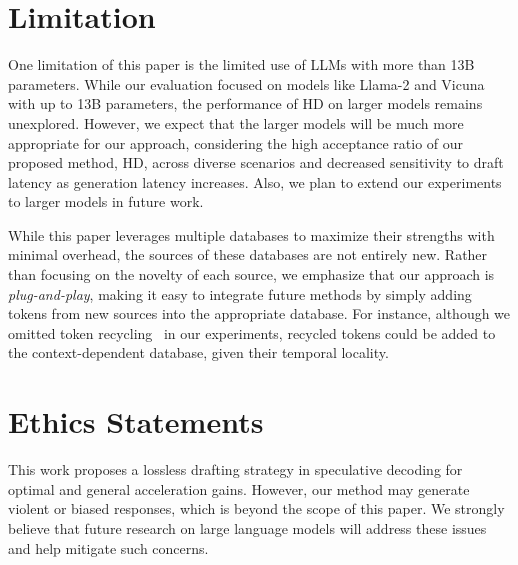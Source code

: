 \section*{Limitation}

One limitation of this paper is the limited use of LLMs with more than 13B parameters. While our evaluation focused on models like Llama-2 and Vicuna with up to 13B parameters, the performance of HD on larger models remains unexplored. However, we expect that the larger models will be much more appropriate for our approach, considering the high acceptance ratio of our proposed method, HD, across diverse scenarios and decreased sensitivity to draft latency as generation latency increases.
Also, we plan to extend our experiments to larger models in future work. 

While this paper leverages multiple databases to maximize their strengths with minimal overhead, the sources of these databases are not entirely new. Rather than focusing on the novelty of each source, we emphasize that our approach is \textit{plug-and-play}, making it easy to integrate future methods by simply adding tokens from new sources into the appropriate database. For instance, although we omitted token recycling~\cite{trashintotreasure} in our experiments, recycled tokens could be added to the context-dependent database, given their temporal locality.

\section*{Ethics Statements}

This work proposes a lossless drafting strategy in speculative decoding for optimal and general acceleration gains. However, our method may generate violent or biased responses, which is beyond the scope of this paper. We strongly believe that future research on large language models will address these issues and help mitigate such concerns.